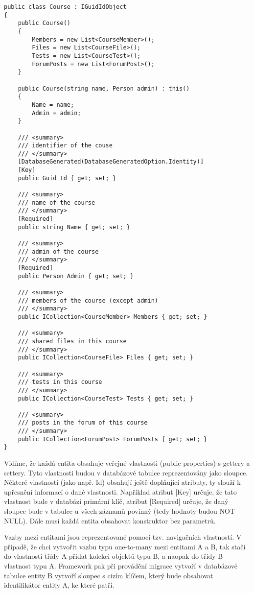 \begin{lstlisting}
public class Course : IGuidIdObject
{
	public Course()
	{
		Members = new List<CourseMember>();
		Files = new List<CourseFile>();
		Tests = new List<CourseTest>();
		ForumPosts = new List<ForumPost>();
	}
	
	public Course(string name, Person admin) : this()
	{
		Name = name;
		Admin = admin;
	}
	
	/// <summary>
	/// identifier of the couse
	/// </summary>
	[DatabaseGenerated(DatabaseGeneratedOption.Identity)]
	[Key]
	public Guid Id { get; set; }
	
	/// <summary>
	/// name of the course
	/// </summary>
	[Required]
	public string Name { get; set; }
	
	/// <summary>
	/// admin of the course
	/// </summary>
	[Required]
	public Person Admin { get; set; }
	
	/// <summary>
	/// members of the course (except admin)
	/// </summary>
	public ICollection<CourseMember> Members { get; set; }
	
	/// <summary>
	/// shared files in this course
	/// </summary>
	public ICollection<CourseFile> Files { get; set; }
	
	/// <summary>
	/// tests in this course
	/// </summary>
	public ICollection<CourseTest> Tests { get; set; }
	
	/// <summary>
	/// posts in the forum of this course
	/// </summary>
	public ICollection<ForumPost> ForumPosts { get; set; }
}
\end{lstlisting}

Vidíme, že každá entita obsahuje veřejné vlastnosti (public properties) s gettery a settery. Tyto vlastnosti budou v databázové tabulce reprezentovány jako sloupce. Některé vlastnosti (jako např. Id) obsahují ještě doplňující atributy, ty slouží k upřesnění informací o dané vlastnosti. Například atribut [Key] určuje, že tato vlastnost bude v databázi primární klíč, atribut [Required] určuje, že daný sloupec bude v tabulce u všech záznamů povinný (tedy hodnoty budou NOT NULL).
Dále musí každá entita obsahovat konstruktor bez parametrů.

Vazby mezi entitami jsou reprezentované pomocí tzv. navigačních vlastností. V případě, že chci vytvořit vazbu typu one-to-many mezi entitami A a B, tak stačí do vlastností třídy A přidat kolekci objektů typu B, a naopak do třídy B vlastnost typu A. Framework pak při provádění migrace vytvoří v databázové tabulce entity B vytvoří sloupec s cizím klíčem, který bude obsahovat identifikátor entity A, ke které patří.

